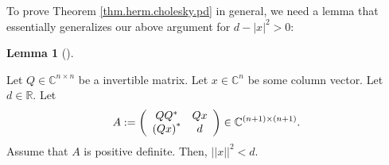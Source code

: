 \documentclass[numbers=enddot,12pt,final,onecolumn,notitlepage]{scrartcl}%
\numberwithin{exer}{subsection}
\theoremstyle{definition}
\newtheorem{lem}[theo]{Lemma}
\newenvironment{lemma}[1][]
{\begin{lem}[#1]\begin{leftbar}}
{\end{leftbar}\end{lem}}
\begin{document}
To prove Theorem \ref{thm.herm.cholesky.pd} in general, we need a lemma that
essentially generalizes our above argument for $d-\left\vert x\right\vert
^{2}>0$:

\begin{lemma}
\label{lem.herm.cholesky.x2d}Let $Q\in\mathbb{C}^{n\times n}$ be a invertible
matrix. Let $x\in\mathbb{C}^{n}$ be some column vector. Let $d\in\mathbb{R}$.
Let%
\[
A:=\left(
\begin{array}
[c]{cc}%
QQ^{\ast} & Qx\\
\left(  Qx\right)  ^{\ast} & d
\end{array}
\right)  \in\mathbb{C}^{\left(  n+1\right)  \times\left(  n+1\right)  }.
\]
Assume that $A$ is positive definite. Then, $\left\vert \left\vert
x\right\vert \right\vert ^{2}<d$.
\end{lemma}
\end{document}
